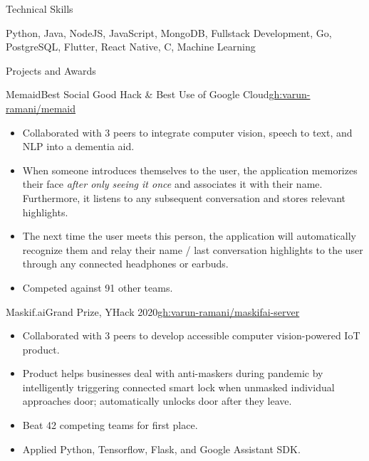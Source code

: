 \documentclass[]{mcdowellcv}
\begin{document}
	\begin{cvsection}{Technical Skills}
		\begin{cvsubsection}{}{}{}
			\vspace{0.5em}
			Python, Java, NodeJS, JavaScript, MongoDB, Fullstack Development, Go, PostgreSQL, Flutter, React Native, C, Machine Learning
		\end{cvsubsection}
	\end{cvsection}

	\begin{cvsection}{Projects and Awards}
		\begin{cvsubsection}{Memaid}{Best Social Good Hack \& Best Use of Google Cloud}{\href{https://github.com/varun-ramani/memaid}{gh:varun-ramani/memaid}}
			\vspace{0.8em}
			\begin{itemize}
				\item Collaborated with 3 peers to integrate computer vision, speech to text, and NLP into a dementia aid.
				\item When someone introduces themselves to the user, the application memorizes their face \emph{after
				      only seeing it once} and associates it with their name. Furthermore, it listens to any subsequent
				      conversation and stores relevant highlights. 
				\item The next time the user meets this person, the application will automatically recognize them and
				      relay their name / last conversation highlights to the user through any connected headphones or earbuds.
				\item Competed against 91 other teams.
			\end{itemize}
		\end{cvsubsection}
		\begin{cvsubsection}{Maskif.ai}{Grand Prize, YHack 2020}{\href{https://github.com/varun-ramani/maskifai-server}{gh:varun-ramani/maskifai-server}}
			\begin{itemize}
				\item Collaborated with 3 peers to develop accessible computer vision-powered IoT product.
				\item Product helps businesses deal with anti-maskers during pandemic by intelligently 
				triggering connected smart lock when unmasked individual approaches door; 
				automatically unlocks door after they leave.
				\item Beat 42 competing teams for first place.
				\item Applied Python, Tensorflow, Flask, and Google Assistant SDK. 

\end{itemize}
\end{cvsubsection}
\end{cvsection}
\end{document}
